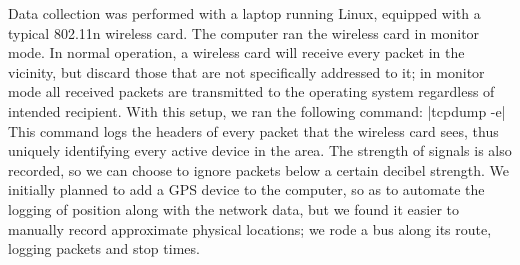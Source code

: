 Data collection was performed with a laptop running Linux, equipped with a typical 802.11n wireless card.
The computer ran the wireless card in monitor mode.
In normal operation, a wireless card will receive every packet in the vicinity, but discard those that are not specifically addressed to it; in monitor mode all received packets are transmitted to the operating system regardless of intended recipient. With this setup, we ran the following command:
|tcpdump -e|
This command logs the headers of every packet that the wireless card sees, thus uniquely identifying every active device in the area.
The strength of signals is also recorded, so we can choose to ignore packets below a certain decibel strength.
We initially planned to add a GPS device to the computer, so as to automate the logging of position along with the network data, but we found it easier to manually record approximate physical locations; we rode a bus along its route, logging packets and stop times.

